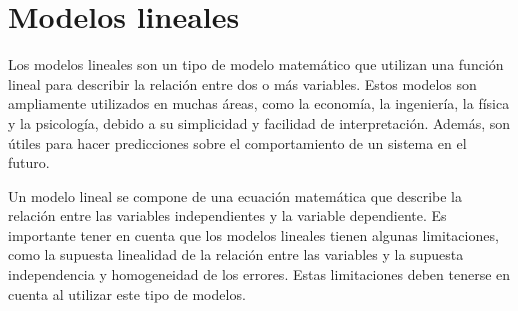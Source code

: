 \section{Modelos lineales}

Los modelos lineales son un tipo de modelo matemático que utilizan una función lineal para describir la relación entre dos o más variables. Estos modelos son ampliamente utilizados en muchas áreas, como la economía, la ingeniería, la física y la psicología, debido a su simplicidad y facilidad de interpretación. Además, son útiles para hacer predicciones sobre el comportamiento de un sistema en el futuro. 
\newline

Un modelo lineal se compone de una ecuación matemática que describe la relación entre las variables independientes y la variable dependiente. Es importante tener en cuenta que los modelos lineales tienen algunas limitaciones, como la supuesta linealidad de la relación entre las variables y la supuesta independencia y homogeneidad de los errores. Estas limitaciones deben tenerse en cuenta al utilizar este tipo de modelos.






\newpage